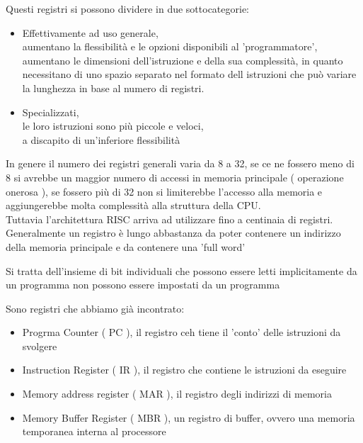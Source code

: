 \documentclass[arch.tex]{subfiles}
\begin{document}
Questi registri si possono dividere in due sottocategorie:

\begin{itemize}
	\item Effettivamente ad uso generale,\\
		aumentano la flessibilità e le opzioni disponibili al 'programmatore',\\
		aumentano le dimensioni dell'istruzione e della sua complessità, in quanto necessitano
		di uno spazio separato nel formato dell istruzioni che può variare la lunghezza 
		in base al numero di registri.
	\item Specializzati,\\
		le loro istruzioni sono più piccole e veloci,\\
		a discapito di un'inferiore flessibilità
\end{itemize}
In genere il numero dei registri generali varia da 8 a 32, se ce ne fossero meno di 8 si avrebbe un maggior
numero di accessi in memoria principale ( operazione onerosa ), se fossero più di 32 non si limiterebbe
l'accesso alla memoria e aggiungerebbe molta complessità alla struttura della CPU.\\
Tuttavia l'architettura RISC arriva ad utilizzare fino a centinaia di registri.\\

Generalmente un registro è lungo abbastanza da poter contenere un indirizzo della memoria principale e 
da contenere una 'full word'

Si tratta dell'insieme di bit individuali che possono essere letti implicitamente da un programma
non possono essere impostati da un programma

Sono registri che abbiamo già incontrato:

\begin{itemize}
	\item Progrma Counter ( PC ), il registro ceh tiene il 'conto' delle istruzioni da svolgere
	\item Instruction Register ( IR ), il registro che contiene le istruzioni da eseguire
	\item Memory address register ( MAR ), il registro degli indirizzi di memoria
	\item Memory Buffer Register ( MBR ), un registro di buffer, ovvero una memoria temporanea interna al
		processore
\end{itemize}
\end{document}
